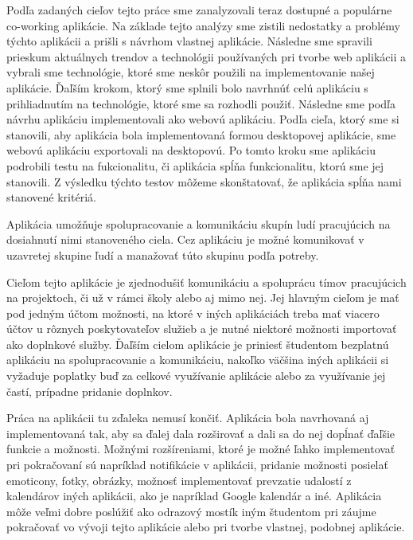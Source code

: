 \indent Podľa zadaných cieľov tejto práce sme zanalyzovali teraz dostupné a populárne co-working aplikácie. Na základe tejto analýzy sme zistili nedostatky a problémy týchto aplikácii a prišli s návrhom vlastnej aplikácie. Následne sme spravili prieskum aktuálnych trendov a technológii používaných pri tvorbe web aplikácii a vybrali sme technológie, ktoré sme neskôr použili na implementovanie našej aplikácie. Ďaľším krokom, ktorý sme splnili bolo navrhnúť celú aplikáciu s prihliadnutím na technológie, ktoré sme sa rozhodli použiť. Následne sme podľa návrhu aplikáciu implementovali ako webovú aplikáciu. Podľa cieľa, ktorý sme si stanovili, aby aplikácia bola implementovaná formou desktopovej aplikácie, sme webovú aplikáciu exportovali na desktopovú. Po tomto kroku sme aplikáciu podrobili testu na fukcionalitu, či aplikácia spĺňa funkcionalitu, ktorú sme jej stanovili. Z výsledku týchto testov môžeme skonštatovať, že aplikácia spĺňa nami stanovené kritériá.

\indent Aplikácia umožňuje spolupracovanie a komunikáciu skupín ludí pracujúcich na dosiahnutí nimi stanoveného ciela. Cez aplikáciu je možné komunikovať v uzavretej skupine ľudí a manažovať túto skupinu podľa potreby.

\indent Cieľom tejto aplikácie je zjednodušiť komunikáciu a spoluprácu tímov pracujúcich na projektoch, či už v rámci školy alebo aj mimo nej. Jej hlavným cieľom je mať pod jedným účtom možnosti, na ktoré v iných aplikáciách treba mať viacero účtov u rôznych poskytovateľov služieb a je nutné niektoré možnosti importovať ako doplnkové služby. Ďaľším cielom aplikácie je priniesť študentom bezplatnú aplikáciu na spolupracovanie a komunikáciu, nakoľko väčšina iných aplikácii si vyžaduje poplatky buď za celkové využívanie aplikácie alebo za využívanie jej častí, prípadne pridanie doplnkov. 

\indent Práca na aplikácii tu zďaleka nemusí končiť. Aplikácia bola navrhovaná aj implementovaná tak, aby sa ďalej dala rozširovať a dali sa do nej dopĺnať ďaľšie funkcie a možnosti. Možnými rozšíreniami, ktoré je možné ľahko implementovať pri pokračovaní sú napríklad notifikácie v aplikácii, pridanie možnosti posielať emoticony, fotky, obrázky, možnosť implementovať prevzatie udalostí z kalendárov iných aplikácii, ako je napríklad Google kalendár a iné. Aplikácia môže veľmi dobre poslúžiť ako odrazový mostík iným študentom pri záujme pokračovať vo vývoji tejto aplikácie alebo pri tvorbe vlastnej, podobnej aplikácie. 